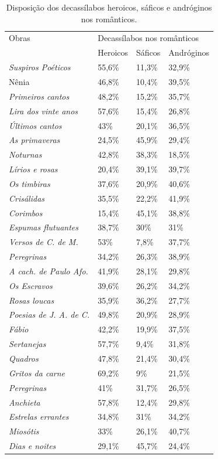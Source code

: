 \documentclass[portuguese]{textolivre}
\begin{document}
\begin{table}[htbp]
\centering
\begin{threeparttable}
\caption{Disposição dos decassílabos heroicos, sáficos e andróginos nos românticos.}
\label{tbl2}
\begin{tabular}{llll}
\toprule
Obras & \multicolumn{3}{l}{Decassílabos nos românticos} \\
& Heroicos & Sáficos & Andróginos \\
\midrule
\textit{Suspiros Poéticos} &
55,6\% &
11,3\% &
32,9\% \\
Nênia &
46,8\% &
10,4\% &
39,5\% \\
\textit{Primeiros cantos} &
48,2\% &
15,2\% &
35,7\% \\
\textit{Lira dos vinte anos} &
57,6\% &
15,4\% &
26,8\% \\
\textit{Últimos cantos} &
43\% &
20,1\% &
36,5\% \\
\textit{As primaveras} &
24,5\% &
45,9\% &
29,4\% \\
\textit{Noturnas} &
42,8\% &
38,3\% &
18,5\% \\
\textit{Lírios e rosas} &
20,4\% & 
39,1\% &
39,7\% \\
\textit{Os timbiras} &
37,6\% &
20,9\% &
40,6\% \\
\textit{Crisálidas} &
35,5\% &
22,2\% &
41,9\% \\
\textit{Corimbos} &
15,4\% &
45,1\% &
38,8\% \\
\textit{Espumas flutuantes} &
38,7\% &
30\% &
31\% \\
\textit{Versos de C. de M.} &
53\% &
7,8\% &
37,7\% \\
\textit{Peregrinas} &
34,2\% &
26,3\% &
38,9\% \\
\textit{A cach. de Paulo Afo.} &
41,9\% &
28,1\% &
29,8\% \\
\textit{Os Escravos} &
39,6\% &
26,2\% &
34,2\% \\
\textit{Rosas loucas} &
35,9\% &
36,2\% &
27,7\% \\
\textit{Poesias de J. A. de C.} &
49,8\% &
20,9\% &
28,9\% \\
\textit{Fábio} &
42,2\% &
19,9\% &
37,5\% \\
\textit{Sertanejas} &
57,7\% &
9,4\% &
31,8\% \\
\textit{Quadros} &
47,8\% &
21,4\% &
30,4\% \\
\textit{Gritos da carne} &
69,2\% &
9\% &
21,5\% \\
\textit{Peregrinas} &
41\% &
31,7\% & 
26,5\% \\
\textit{Anchieta} &
57,8\% & 
12,4\% &
29,8\% \\
\textit{Estrelas errantes} &
34,8\% &
31\% &
34,2\% \\
\textit{Miosótis} &
33\% &
26,1\% &
40,7\% \\
\textit{Dias e noites} &
29,1\% &
45,7\% &
24,4\% \\
\bottomrule
\end{tabular}
\end{threeparttable}
\end{table}
\end{document}
